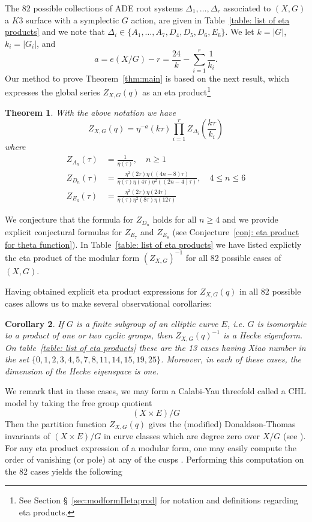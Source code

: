\documentclass{article}
\newtheorem{theorem}{Theorem}%
\newtheorem{corollary}[theorem]{Corollary}
\theoremstyle{definition}
\begin{document}
The 82 possible collections of ADE root systems $\Delta_{1},\dots
,\Delta_{r}$ associated to $(X,G)$ a $K3$ surface with a symplectic
$G$ action, are given in Table~\ref{table: list of eta products} and
we note that $\Delta_{i}\in \{A_{1},\dots
,A_{7},D_{4},D_{5},D_{6},E_{6} \}$. We let $k=|G|$, $k_{i}=|G_{i}|$,
and
\[
a = e(X/G) - r=\frac{24}{k}-\sum_{i=1}^{r} \frac{1}{k_{i}}.
\]
Our method to prove Theorem~\ref{thm:main} is based on the next result, which expresses the global series $Z_{X,G}(q)$ as an eta product\footnote{See
	Section \S~\ref{sec:modformIIetaprod}  for notation and definitions regarding eta products.} 
\begin{theorem}\label{thm: eta product formula for Z}
With the above notation we have
\[
Z_{X,G}(q) = \eta^{-a}(k\tau )\prod_{i=1}^{r}
Z_{\Delta_{i}}\left(\frac{k\tau}{k_{i}} \right)
\]
where 
\begin{align*}
Z_{A_{n}} (\tau ) &=\frac{1}{\eta (\tau )}, \quad n\geq 1\\
Z_{D_{n}} (\tau ) &=\frac{\eta^{2}(2\tau )\eta((4n-8)\tau )}{\eta (\tau )\eta (4\tau )\eta^{2}((2n-4)\tau )}, \quad 4\leq n\leq 6\\
Z_{E_{6}} (\tau ) &=\frac{\eta^{2}(2\tau )\eta(24\tau )}{\eta (\tau
)\eta^{2} (8\tau )\eta(12\tau )}
\end{align*}
\end{theorem}
We conjecture that the formula for $Z_{D_{n}}$ holds for all $n\geq 4$
and we provide explicit conjectural formulas for $Z_{E_{7}}$ and
$Z_{E_{8}}$ (see Conjecture~\ref{conj: eta product for theta
function}). In Table~\ref{table: list of eta products} we have listed
explictly the eta product of the modular form $(Z_{X,G})^{-1}$ for all
82 possible cases of $(X,G)$.

Having obtained explicit eta product expressions for $Z_{X,G}(q)$ in all 82 possible
cases allows us to make several observational corollaries:

\begin{corollary}\label{cor: if G is a subgp of E then Zinv is a Hecke
eigenform}
If $G$ is a finite subgroup of an elliptic curve $E$, i.e. $G$ is
isomorphic to a product of one or two cyclic groups, then
$Z_{X,G}(q)^{-1}$ is a Hecke eigenform. On table~\ref{table: list of
eta products} these are the 13 cases having Xiao number in the set
$\{0,1,2,3,4,5,7,8,11,14,15,19,25 \}$. Moreover, in each of these
cases, the dimension of the Hecke eigenspace is one. 
\end{corollary}

We remark that in these cases, we may form a Calabi-Yau threefold
called a CHL model by taking the free group quotient
\[
(X\times E)/G
\]
Then the partition function $Z_{X,G}(q)$ gives the (modified)
Donaldson-Thomas invariants of $(X\times E)/G$ in curve classes which
are degree zero over $X/G$ (see \cite{bryan2018chl}).
For any eta product expression of a modular form, one may easily compute the
order of vanishing (or pole) at any of the cusps
\cite[Cor~2.2]{kohler2011eta}. Performing this computation on the 82
cases yields the following
\end{document}
